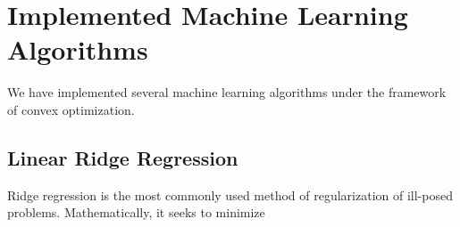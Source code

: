 \section{Implemented Machine Learning Algorithms}

We have implemented several machine learning algorithms under the
framework of convex optimization.

\subsection{Linear Ridge Regression}
Ridge regression is the most commonly used method of regularization of
ill-posed problems. Mathematically, it seeks to minimize 
\begin{equation}

\end{equation}
